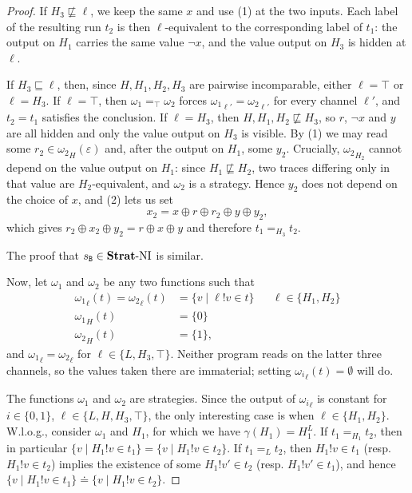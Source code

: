 \documentclass[preprint,5p,twocolumn]{elsarticle}
\begin{document}
\begin{proof}
  If $H_3 \not\sqsubseteq \ell$, we keep the same $x$ and use (1) at the two inputs. Each label of
  the resulting run $t_2$ is then $\ell$-equivalent to the corresponding label of $t_1$: the output
  on $H_1$ carries the same value $\neg x$, and the value output on $H_3$ is hidden at $\ell$.

  If $H_3 \sqsubseteq \ell$, then, since $H,H_1,H_2,H_3$ are pairwise incomparable, either
  $\ell = \top$ or $\ell = H_3$. If $\ell = \top$, then $\omega_1 =_\top \omega_2$ forces
  ${\omega_1}_{\ell'} = {\omega_2}_{\ell'}$ for every channel $\ell'$, and $t_2 = t_1$ satisfies
  the conclusion. If $\ell = H_3$, then $H, H_1, H_2 \not\sqsubseteq H_3$, so $r$, $\neg x$ and $y$
  are all hidden and only the value output on $H_3$ is visible. By (1) we may read some
  $r_2 \in {\omega_2}_H(\varepsilon)$ and, after the output on $H_1$, some $y_2$. Crucially,
  ${\omega_2}_{H_2}$ cannot depend on the value output on $H_1$: since $H_1 \not\sqsubseteq H_2$,
  two traces differing only in that value are $H_2$-equivalent, and $\omega_2$ is a strategy.
  Hence $y_2$ does not depend on the choice of $x$, and (2) lets us set
  $$x_2 = x \oplus r \oplus r_2 \oplus y \oplus y_2,$$
  which gives $r_2 \oplus x_2 \oplus y_2 = r \oplus x \oplus y$ and therefore $t_1 =_{H_3} t_2$.

  The proof that $s_{\mathtt{B}} \in \mathbf{Strat}\text{-}\mathrm{NI}$ is similar.

  Now, let $\omega_1$ and $\omega_2$ be any two functions such that
  \begin{align*}
    {\omega_1}_{\ell}(t) = {\omega_2}_{\ell}(t) &= \lbrace v \mid \ell ! v \in t \rbrace && \ell \in \{H_1,H_2\}\\
    {\omega_1}_H(t) &= \{0\} \\
    {\omega_2}_H(t) &= \{1\},
  \end{align*}
  and ${\omega_1}_{\ell} = {\omega_2}_{\ell}$ for $\ell \in \{L,H_3,\top\}$. Neither program reads
  on the latter three channels, so the values taken there are immaterial; setting
  ${\omega_i}_{\ell}(t) = \emptyset$ will do.

  The functions $\omega_1$ and $\omega_2$ are strategies. Since the output of ${\omega_i}_{\ell}$ is constant
  for $i \in \{0,1\}$, $\ell \in \{L,H,H_3,\top\}$, the only interesting case is when $\ell \in \{H_1,H_2\}$.
  W.l.o.g., consider $\omega_1$ and $H_1$, for which we have $\gamma(H_1) = H_1^L$. If $t_1 =_{H_1} t_2$,
  then in particular $\lbrace v \mid H_1!v  \in t_1\rbrace = \lbrace v \mid H_1! v \in t_2\rbrace$.
  If $t_1 =_L t_2$, then $H_1 ! v \in t_1$ (resp. $H_1 ! v \in t_2$) implies the existence of some $H_1 ! v' \in t_2$
  (resp. $H_1 ! v' \in t_1$), and  hence $\lbrace v \mid H_1!v  \in t_1\rbrace \doteq \lbrace v \mid H_1! v \in t_2\rbrace$.


\end{proof}
\end{document}
